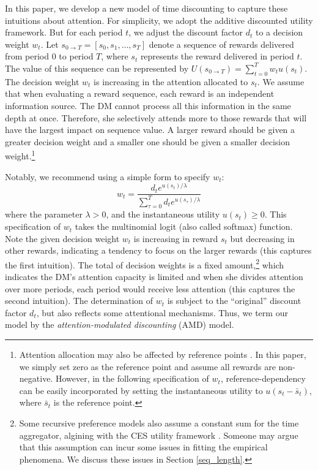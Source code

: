\documentclass[
  12pt,
]{article}
\begin{document}
In this paper, we develop a new model of time discounting to capture
these intuitions about attention. For simplicity, we adopt the additive
discounted utility framework. But for each period \(t\), we adjust the
discount factor \(d_t\) to a decision weight \(w_t\). Let
\(s_{0\rightarrow T}=[s_0,s_1,…,s_T]\) denote a sequence of rewards
delivered from period 0 to period \(T\), where \(s_t\) represents the
reward delivered in period \(t\). The value of this sequence can be
represented by \(U(s_{0\rightarrow T})=\sum_{t=0}^T w_t u(s_t)\). The
decision weight \(w_t\) is increasing in the attention allocated to
\(s_t\). We assume that when evaluating a reward sequence, each reward
is an independent information source. The DM cannot process all this
information in the same depth at once. Therefore, she selectively
attends more to those rewards that will have the largest impact on
sequence value. A larger reward should be given a greater decision
weight and a smaller one should be given a smaller decision
weight.\footnote{Attention allocation may also be affected by reference
  points \citep{bordalo2012salience, kHoszegi2013model}. In this paper,
  we simply set zero as the reference point and assume all rewards are
  non-negative. However, in the following specification of \(w_t\),
  reference-dependency can be easily incorporated by setting the
  instantaneous utility to \(u(s_t-\bar{s}_t)\), where \(\bar{s}_t\) is
  the reference point.}

Notably, we recommend using a simple form to specify \(w_t\):\[
w_t = \frac{d_te^{u(s_t)/\lambda}}{\sum_{\tau=0}^T d_te^{u(s_\tau)/\lambda}}
\]where the parameter \(\lambda>0\), and the instantaneous utility
\(u(s_t)\geq 0\). This specification of \(w_t\) takes the multinomial
logit (also called softmax) function. Note the given decision weight
\(w_t\) is increasing in reward \(s_t\) but decreasing in other rewards,
indicating a tendency to focus on the larger rewards (this captures the
first intuition). The total of decision weights is a fixed
amount,\footnote{Some recursive preference models also assume a constant
  sum for the time aggregator, algining with the CES utility framework
  \citep{epstein1991substitution, weil1990nonexpected}. Someone may
  argue that this assumption can incur some issues in fitting the
  empirical phenomena. We discuss these issues in Section
  \ref{seq_length}.} which indicates the DM's attention capacity is
limited and when she divides attention over more periods, each period
would receive less attention (this captures the second intuition). The
determination of \(w_t\) is subject to the ``original'' discount factor
\(d_t\), but also reflects some attentional mechanisms. Thus, we term
our model by the \emph{attention-modulated discounting} (AMD) model.
\end{document}
